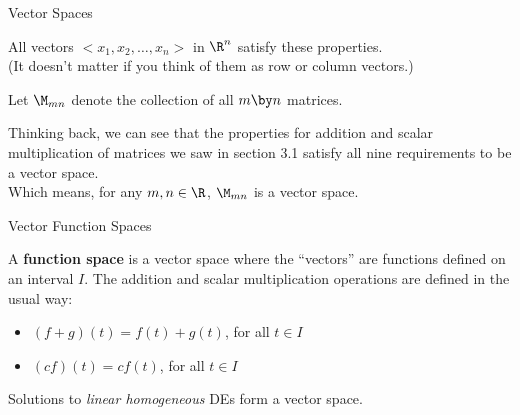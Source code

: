 \documentclass{beamer}
\begin{document}
\begin{frame}{Vector Spaces}
\begin{example}
All vectors $<x_1,x_2,\dots,x_n>$ in $\R^n$ satisfy these properties.\\(It doesn't matter if you think of them as row or column vectors.)
\end{example}\pause

\begin{definition}
Let $\M_{mn}$ denote the collection of all $m \by n$ matrices.
\end{definition}\pause

\begin{example}
Thinking back, we can see that the properties for addition and scalar multiplication of matrices we saw in section 3.1 satisfy all nine requirements to be a vector space.\\Which means, for any $m,n\in\R$, $\M_{mn}$ is a vector space.
\end{example}
\end{frame}

\begin{frame}{Vector Function Spaces}
\begin{definition}
A \textbf{function space} is a vector space where the ``vectors'' are functions defined on an interval $I$. The addition and scalar multiplication operations are defined in the usual way:
\begin{itemize}
\item $(f+g)(t) = f(t)+g(t)$, for all $t\in I$
\item $(cf)(t)=cf(t)$, for all $t\in I$
\end{itemize}
\end{definition}\pause

\begin{block}{}
Solutions to \emph{linear homogeneous} DEs form a vector space.
\end{block}
\end{frame}
\end{document}
